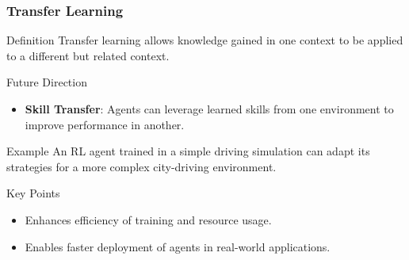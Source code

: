 \documentclass[aspectratio=169]{beamer}
\begin{document}
\begin{frame}[fragile]
    \frametitle{Transfer Learning}
    \begin{block}{Definition}
        Transfer learning allows knowledge gained in one context to be applied to a different but related context.
    \end{block}

    \begin{block}{Future Direction}
        \begin{itemize}
            \item \textbf{Skill Transfer}: Agents can leverage learned skills from one environment to improve performance in another.
        \end{itemize}
    \end{block}

    \begin{block}{Example}
        An RL agent trained in a simple driving simulation can adapt its strategies for a more complex city-driving environment.
    \end{block}

    \begin{block}{Key Points}
        \begin{itemize}
            \item Enhances efficiency of training and resource usage.
            \item Enables faster deployment of agents in real-world applications.
        \end{itemize}
    \end{block}
\end{frame}
\end{document}
